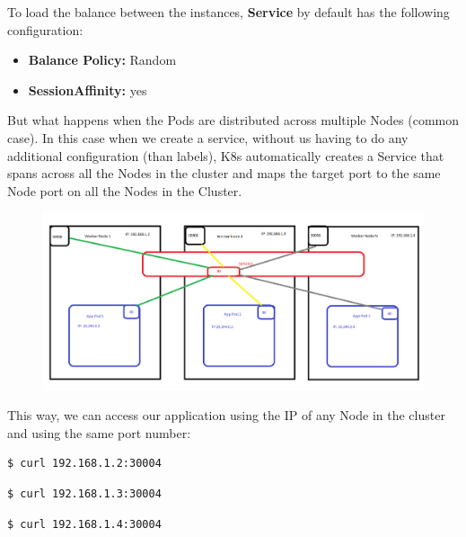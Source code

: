 \documentclass{article}
\newenvironment{blocktemplateI}[1]{%
    \tcolorbox[beamer,%
    noparskip,breakable,
    colframe=Violet,%
    colbacklower=Black,%
    title=#1]}%
    {\endtcolorbox}
\newenvironment{codetemplate}[1][]{%
  \mybasecolorbox[#1]
  \itshape
}{%
  \endmybasecolorbox
}
\begin{document}
\begin{blocktemplateI}{NOTE}
To load the balance between the instances, \textbf{Service} by default has the following configuration:

\begin{itemize}
    \item \textbf{Balance Policy:} Random
    \item \textbf{SessionAffinity:} yes
\end{itemize}
\end{blocktemplateI}

But what happens when the Pods are distributed across multiple Nodes (common case). In this case when we create a service, without us having to do any additional configuration (than labels), K8s automatically creates a Service that spans across all the Nodes in the cluster and maps the target port to the same Node port on all the Nodes in the Cluster.

\begin{figure}[H]
    \centering
    \includegraphics[width=\textwidth]{pictures/service5.png}
\end{figure}

This way, we can access our application using the IP of any Node in the cluster and using the same port number:

\begin{codetemplate}{}
\begin{verbatim}
$ curl 192.168.1.2:30004
\end{verbatim}
\end{codetemplate}

\begin{codetemplate}{}
\begin{verbatim}
$ curl 192.168.1.3:30004
\end{verbatim}
\end{codetemplate}

\begin{codetemplate}{}
\begin{verbatim}
$ curl 192.168.1.4:30004
\end{verbatim}
\end{codetemplate}
\end{document}
